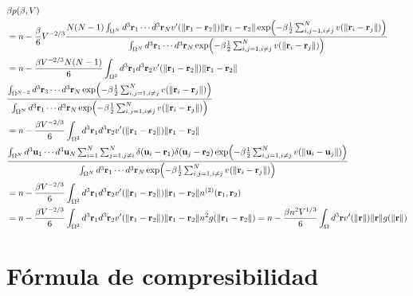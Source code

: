 \documentclass{article}
\begin{document}
\begin{align}
\begin{split}
&\beta p(\beta,V)\\
&= n-\frac{\beta}{6}V^{-2/3}\frac{N(N-1)\int_{\Omega^N}d^3\vb{r}_1\cdots d^3\vb{r}_Nv'(\|\vb{r}_1-\vb{r}_2\|)\|\vb{r}_1-\vb{r}_2\|\exp(-\beta\frac{1}{2}\sum_{i,j=1,i\neq j}^Nv(\|\vb{r}_i-\vb{r}_j\|))}{\int_{\Omega^N}d^3\vb{r}_1\cdots d^3\vb{r}_N\exp(-\beta\frac{1}{2}\sum_{i,j=1,i\neq j}^Nv(\|\vb{r}_i-\vb{r}_j\|))}\\
&= n-\frac{\beta V^{-2/3}N(N-1)}{6}\int_{\Omega^2}d^3\vb{r}_1d^3\vb{r}_2v'(\|\vb{r}_1-\vb{r}_2\|)\|\vb{r}_1-\vb{r}_2\|\\
&\frac{\int_{\Omega^{N-2}} d^3\vb{r}_3\cdots d^3\vb{r}_N\exp(-\beta\frac{1}{2}\sum_{i,j=1,i\neq j}^Nv(\|\vb{r}_i-\vb{r}_j\|))}{\int_{\Omega^N}d^3\vb{r}_1\cdots d^3\vb{r}_N\exp(-\beta\frac{1}{2}\sum_{i,j=1,i\neq j}^Nv(\|\vb{r}_i-\vb{r}_j\|))}\\
&= n-\frac{\beta V^{-2/3}}{6}\int_{\Omega^2}d^3\vb{r}_1d^3\vb{r}_2v'(\|\vb{r}_1-\vb{r}_2\|)\|\vb{r}_1-\vb{r}_2\|\\
&\frac{\int_{\Omega^N} d^3\vb{u}_1\cdots d^3\vb{u}_N\sum_{i=1}^N\sum_{j=1,j\neq i}^N\delta(\vb{u}_i-\vb{r}_1)\delta(\vb{u}_j-\vb{r}_2)\exp(-\beta\frac{1}{2}\sum_{i,j=1,i\neq j}^Nv(\|\vb{u}_i-\vb{u}_j\|))}{\int_{\Omega^N}d^3\vb{r}_1\cdots d^3\vb{r}_N\exp(-\beta\frac{1}{2}\sum_{i,j=1,i\neq j}^Nv(\|\vb{r}_i-\vb{r}_j\|))}\\
&= n-\frac{\beta V^{-2/3}}{6}\int_{\Omega^2}d^3\vb{r}_1d^3\vb{r}_2v'(\|\vb{r}_1-\vb{r}_2\|)\|\vb{r}_1-\vb{r}_2\|n^{(2)}(\vb{r}_1,\vb{r}_2)\\
&= n-\frac{\beta V^{-2/3}}{6}\int_{\Omega^2}d^3\vb{r}_1d^3\vb{r}_2v'(\|\vb{r}_1-\vb{r}_2\|)\|\vb{r}_1-\vb{r}_2\|n^2g(\|\vb{r}_1-\vb{r}_2\|)= n-\frac{\beta n^2V^{1/3}}{6}\int_{\Omega}d^3\vb{r}v'(\|\vb{r}\|)\|\vb{r}\|g(\|\vb{r}\|)\\
\end{split}
\end{align}

\section{Fórmula de compresibilidad}
\end{document}
